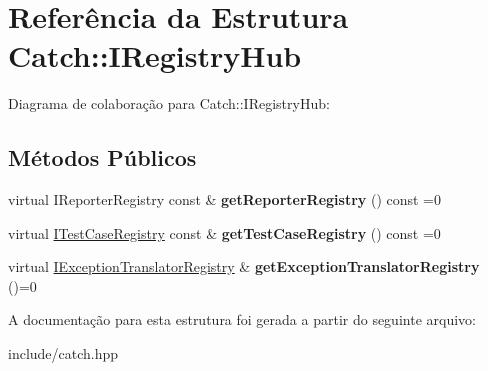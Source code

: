 \hypertarget{structCatch_1_1IRegistryHub}{}\section{Referência da Estrutura Catch\+:\+:I\+Registry\+Hub}
\label{structCatch_1_1IRegistryHub}


Diagrama de colaboração para Catch\+:\+:I\+Registry\+Hub\+:
\subsection*{Métodos Públicos}
\begin{DoxyCompactItemize}
\item 
virtual I\+Reporter\+Registry const \& {\bfseries get\+Reporter\+Registry} () const =0\hypertarget{structCatch_1_1IRegistryHub_a55534563f7ecf7e20ec1e37285ebe54d}{}\label{structCatch_1_1IRegistryHub_a55534563f7ecf7e20ec1e37285ebe54d}

\item 
virtual \hyperlink{structCatch_1_1ITestCaseRegistry}{I\+Test\+Case\+Registry} const \& {\bfseries get\+Test\+Case\+Registry} () const =0\hypertarget{structCatch_1_1IRegistryHub_af4f6255f0c0f8f1f179fa9d7d4843076}{}\label{structCatch_1_1IRegistryHub_af4f6255f0c0f8f1f179fa9d7d4843076}

\item 
virtual \hyperlink{structCatch_1_1IExceptionTranslatorRegistry}{I\+Exception\+Translator\+Registry} \& {\bfseries get\+Exception\+Translator\+Registry} ()=0\hypertarget{structCatch_1_1IRegistryHub_a3606988da110c016c5af3ae63454eb78}{}\label{structCatch_1_1IRegistryHub_a3606988da110c016c5af3ae63454eb78}

\end{DoxyCompactItemize}


A documentação para esta estrutura foi gerada a partir do seguinte arquivo\+:\begin{DoxyCompactItemize}
\item 
include/catch.\+hpp\end{DoxyCompactItemize}
